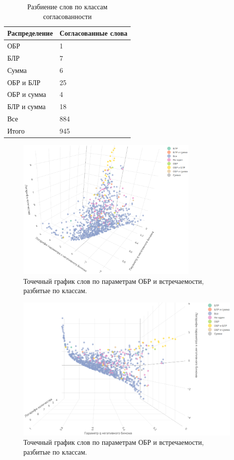 \documentclass[12pt, specialist, subf, substylefile = spbu_report.rtx]{disser}
\begin{document}
	\begin{table}[t]
		\centering
		\caption{Разбиение слов по классам согласованности}
		\begin{tabular}{l|l}
			Распределение 		   & Согласованные слова \\
			\hline
			ОБР                    & 1               \\
			БЛР                    & 7               \\
			Сумма                  & 6              \\
			ОБР и БЛР              & 25              \\
			ОБР и сумма            & 4              \\
			БЛР и сумма            & 18              \\
			Все                    & 884             \\
			\hline
			Итого                  & 945          
		\end{tabular}
		\label{tab:wordclass}
	\end{table}

	\begin{figure}[t]
		\centering
		\includegraphics[width = 0.8\textwidth]{wordclassmain}
		\caption{Точечный график слов по параметрам ОБР и встречаемости, разбитые по классам.}
		\label{img:wordclassmain}
	\end{figure}
	
	\begin{figure}[t]
		\centering
		\includegraphics[width = 1\textwidth]{wordclassup}
		\caption{Точечный график слов по параметрам ОБР и встречаемости, разбитые по классам.}
		\label{img:wordclassup}
	\end{figure}
\end{document}
